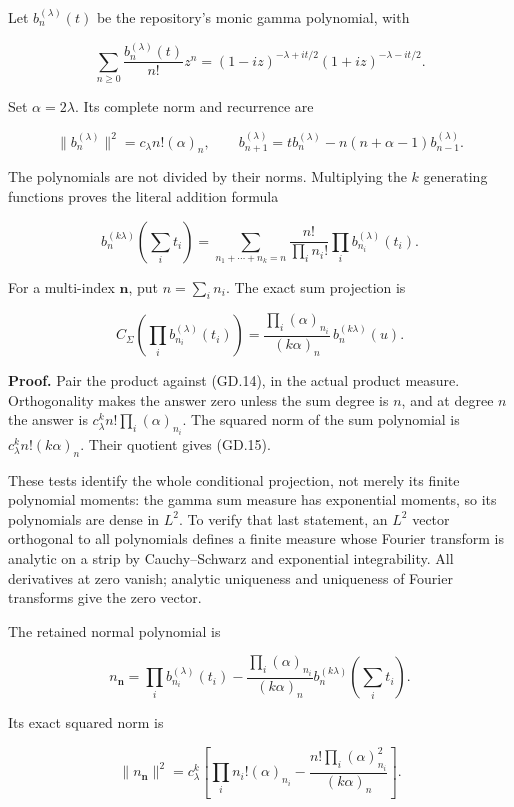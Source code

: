 Let \(b_n^{(\lambda)}(t)\) be the repository's monic gamma polynomial,
with

\[
\sum_{n\ge0}\frac{b_n^{(\lambda)}(t)}{n!}z^n
=(1-iz)^{-\lambda+it/2}(1+iz)^{-\lambda-it/2}.
\]

Set \(\alpha=2\lambda\). Its complete norm and recurrence are

\[
\|b_n^{(\lambda)}\|^2=c_\lambda n!(\alpha)_n,\qquad
b_{n+1}^{(\lambda)}=t b_n^{(\lambda)}-n(n+\alpha-1)b_{n-1}^{(\lambda)}.
                                                                    \tag{GD.13}
\]

The polynomials are not divided by their norms. Multiplying the \(k\)
generating functions proves the literal addition formula

\[
b_n^{(k\lambda)}(\sum_i t_i)
=\sum_{n_1+\cdots+n_k=n}\frac{n!}{\prod_i n_i!}
                         \prod_i b_{n_i}^{(\lambda)}(t_i).         \tag{GD.14}
\]

For a multi-index \(\mathbf n\), put \(n=\sum_i n_i\). The exact sum
projection is

\[
\boxed{
C_\Sigma\left(\prod_i b_{n_i}^{(\lambda)}(t_i)\right)
 =\frac{\prod_i(\alpha)_{n_i}}{(k\alpha)_n}\,b_n^{(k\lambda)}(u).
}                                                                   \tag{GD.15}
\]

\textbf{Proof.} Pair the product against (GD.14), in the actual product
measure. Orthogonality makes the answer zero unless the sum degree is
\(n\), and at degree \(n\) the answer is
\(c_\lambda^k n!\prod_i(\alpha)_{n_i}\). The squared norm of the sum
polynomial is \(c_\lambda^k n!(k\alpha)_n\). Their quotient gives (GD.15).

These tests identify the whole conditional projection, not merely its
finite polynomial moments: the gamma sum measure has exponential
moments, so its polynomials are dense in \(L^2\). To verify that last
statement, an \(L^2\) vector orthogonal to all polynomials defines a
finite measure whose Fourier transform is analytic on a strip by
Cauchy--Schwarz and exponential integrability. All derivatives at zero
vanish; analytic uniqueness and uniqueness of Fourier transforms give
the zero vector.

The retained normal polynomial is

\[
n_{\mathbf n}=\prod_i b_{n_i}^{(\lambda)}(t_i)
 -\frac{\prod_i(\alpha)_{n_i}}{(k\alpha)_n}
                    b_n^{(k\lambda)}(\sum_i t_i).
\]

Its exact squared norm is

\[
\boxed{
\|n_{\mathbf n}\|^2
=c_\lambda^k\left[
\prod_i n_i!(\alpha)_{n_i}
 -\frac{n!\prod_i(\alpha)_{n_i}^2}{(k\alpha)_n}
\right].
}                                                                   \tag{GD.16}
\]

